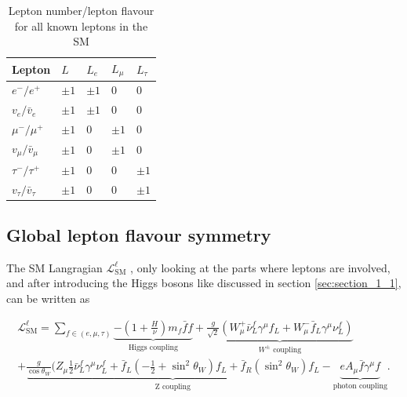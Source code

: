 \begin{table}[h]
	\centering
	\caption[Lepton number/lepton flavour of leptons]{Lepton number/lepton flavour for all known leptons in the \gls{SM}}
	\label{tab:tab_1_2}

	\begin{tabular}{l|l|l|l|l}
		Lepton				&$L$		&$L_{e}$	&$L_{\mu}$	&$L_{\tau}$	\\ \hline
		
		$e^{-}/e^{+}$			&$\pm 1$	&$\pm 1$	&0		&0		\\

		$v_{e}/\bar{v}_{e}$		&$\pm 1$	&$\pm 1$	&0		&0		\\
		
		$\mu^{-}/\mu^{+}$		&$\pm 1$	&0		&$\pm 1$	&0		\\

		$v_{\mu}/\bar{v}_{\mu}$		&$\pm 1$	&0		&$\pm 1$	&0		\\
		
		$\tau^{-}/\tau^{+}$		&$\pm 1$	&0		&0		&$\pm 1$	\\

		$v_{\tau}/\bar{v}_{\tau}$	&$\pm 1$	&0		&0		&$\pm 1$	\\			
	\end{tabular}
\end{table}


\subsection{Global lepton flavour symmetry}
\label{sec:section_1_3_1}

The \gls{SM} Langragian $\mathcal{L}^{\ell}_{\text{SM}}$ \cite{Peskin, EWK}, only looking at the parts where leptons are involved, and after introducing the Higgs bosons like discussed in section \ref{sec:section_1_1}, can be written as

\begin{multline}
	\label{eq:eq_1_12}
	\mathcal{L}^{\ell}_{\text{SM}} = \sum_{f \in (e, \mu, \tau)} \underbrace{-(1+\frac{H}{\nu}) m_{f} \bar{f}f}_\text{Higgs coupling} + \underbrace{\frac{g}{\sqrt{2}} (W^{+}_{\mu} \bar{\nu}^{f}_{L} \gamma^{\mu} f_{L} + W^{-}_{\mu} \bar{f}_{L} \gamma^{\mu} \nu^{f}_{L})}_{W^{\pm} \text{ coupling}} \\
	+ \underbrace{\frac{g}{\cos{\theta_{W}}}(Z_{\mu} \frac{1}{2} \bar{\nu}^{f}_{L} \gamma^{\mu}\nu^{f}_{L} + \bar{f}_{L}(-\frac{1}{2} + \sin^2{\theta_{W}})f_{L} + \bar{f}_{R}(\sin^2{\theta_{W}})f_{L}}_{\text{Z coupling}} - \underbrace{eA_{\mu}\bar{f}\gamma^{\mu}f}_{\text{photon coupling}}.
\end{multline}

